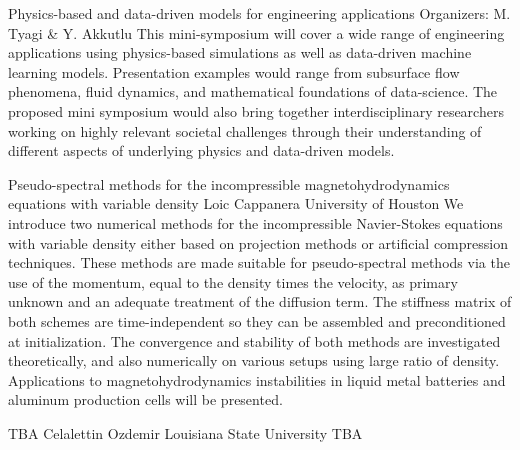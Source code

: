 \label{mini06}

\miniabs
{Physics-based and data-driven models for engineering applications}
{Organizers: M. Tyagi \& Y. Akkutlu}
{This mini-symposium will cover a wide range of engineering applications using physics-based simulations as well as data-driven machine learning models. Presentation examples would range from subsurface flow phenomena, fluid dynamics, and mathematical foundations of data-science. The proposed mini symposium would also bring together interdisciplinary researchers working on highly relevant societal challenges through their understanding of different aspects of underlying physics and data-driven models.}
\vspace{2ex}


\begin{addmargin}[2em]{0em}

\abs
{Pseudo-spectral methods for the incompressible magnetohydrodynamics equations with variable density}
{Loic Cappanera}
{University of Houston}
{We introduce two numerical methods for the incompressible Navier-Stokes equations with variable density either based on projection methods or artificial compression techniques. These methods are made suitable for pseudo-spectral methods via the use of the momentum, equal to the density times the velocity, as primary unknown and an adequate treatment of the diffusion term. The stiffness matrix of both schemes are time-independent so they can be assembled and preconditioned at initialization. The convergence and stability of both methods are investigated theoretically, and also numerically on various setups using large ratio of density. Applications to magnetohydrodynamics instabilities in liquid metal batteries and aluminum production cells will be presented.}

\vspace{1.5ex}
\abs
{TBA}
{Celalettin Ozdemir}
{Louisiana State University}
{TBA}


\end{addmargin}
